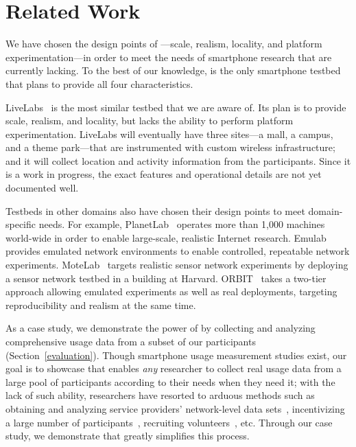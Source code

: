 \section{Related Work}
\label{sec:related}

We have chosen the design points of \PhoneLab{}---scale, realism, locality, and
platform experimentation---in order to meet the needs of smartphone research
that are currently lacking. To the best of our knowledge, \PhoneLab{} is the
only smartphone testbed that plans to provide all four characteristics.

LiveLabs~\cite{livelabs} is the most similar testbed that we are aware of. Its
plan is to provide scale, realism, and locality, but lacks the ability to
perform platform experimentation. LiveLabs will eventually have three sites---a
mall, a campus, and a theme park---that are instrumented with custom wireless
infrastructure; and it will collect location and activity information from the
participants. Since it is a work in progress, the exact features and operational
details are not yet documented well.

Testbeds in other domains also have chosen their design points to meet
domain-specific needs. For example, PlanetLab~\cite{peterson:ccr:2003,
planetlab} operates more than 1,000 machines world-wide in order to enable
large-scale, realistic Internet research. Emulab~\cite{white:osdi:2002, emulab}
provides emulated network environments to enable controlled, repeatable
network experiments. MoteLab~\cite{werner-allen:ipsn:2005} targets realistic
sensor network experiments by deploying a sensor network testbed in a building
at Harvard. ORBIT~\cite{raychaudhuri:tridentcom:2005} takes a two-tier approach
allowing emulated experiments as well as real deployments, targeting
reproducibility and realism at the same time.

As a case study, we demonstrate the power of \PhoneLab{} by collecting and
analyzing comprehensive usage data from a subset of our participants
(Section~\ref{evaluation}). Though smartphone usage measurement studies exist,
our goal is to showcase that \PhoneLab{} enables {\it any} researcher to
collect real usage data from a large pool of participants according to their
needs when they need it; with the lack of such ability, researchers have
resorted to arduous methods such as obtaining and analyzing service providers'
network-level data sets~\cite{xu:imc:2011, trestian:imc:2009,
trestian:ton:2012}, incentivizing a large number of
participants~\cite{falaki:mobisys:2010}, recruiting
volunteers~\cite{shye:micro:2009}, etc. Through our case study, we demonstrate
that \PhoneLab{} greatly simplifies this process.

